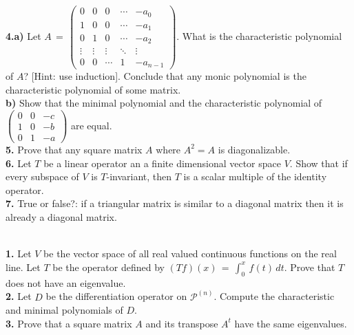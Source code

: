 \documentclass[11pt]{amsart}
\theoremstyle{definition}  %
\begin{document}
\vskip 0.1cm
\noindent
{\bf 4.a)} Let $A \, = \, \left( \begin{array}{ccccr} 0 & 0 & 0 & \cdots & -a_0 \\ 1 & 0 & 0 & \cdots & -a_1 \\ 0 & 1 & 0 & \cdots & -a_2 \\ 
\vdots & \vdots & \vdots & \ddots & \vdots \\ 0 & 0 & \cdots & 1 & -a_{n-1} \end{array} \right)$. What is the characteristic polynomial of $A$? [Hint: use induction].
Conclude that any monic polynomial is the characteristic polynomial of some matrix. \\
{\bf b)} Show that the minimal polynomial and the characteristic polynomial of $\left( \begin{array}{ccr} 0 & 0 & -c \\ 1 & 0 & -b \\ 0 & 1 & -a \end{array} \right)$ are equal.\\


\vskip 0.1cm
\noindent
{\bf 5.} Prove that any square matrix $A$ where $A^2 = A$ is diagonalizable. \\

\vskip 0.1cm
\noindent
{\bf 6.} Let $T$ be a linear operator an a finite dimensional vector space $V$. Show that if  every subspace of $V$ is $T$-invariant, then $T$ is a scalar multiple
 of the identity operator.\\


\vskip 0.1cm
\noindent
{\bf 7.}  True or false?: if a triangular matrix is similar to a diagonal matrix then it is already a diagonal matrix.






\vfill
\eject
{}\\
{\bf 1.} Let $V$ be the vector space of all real valued continuous functions on the real line. Let $T$ be the operator defined by $(Tf)(x) \, = \, \int_0^x \, f(t) \, dt$. Prove 
that $T$ does not have an eigenvalue. \\

\vskip 0.1cm
\noindent 
{\bf 2.} Let $D$ be the differentiation operator on $\mathcal{P}^{(n)}$. Compute the characteristic and minimal polynomials of $D$. \\

\vskip 0.1cm
\noindent 
{\bf 3.}  Prove that a square matrix $A$ and its transpose $A^t$ have the same eigenvalues. \\
\end{document}
